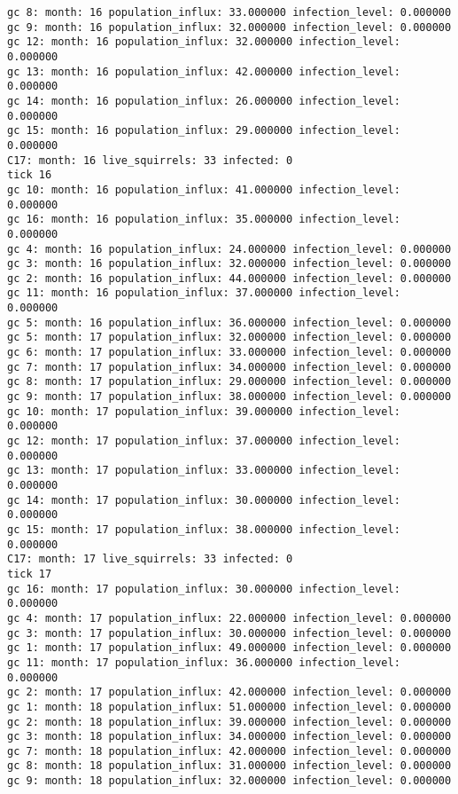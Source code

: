 \begin{lstlisting}[basicstyle=\tiny]
gc 8: month: 16 population_influx: 33.000000 infection_level: 0.000000
gc 9: month: 16 population_influx: 32.000000 infection_level: 0.000000
gc 12: month: 16 population_influx: 32.000000 infection_level: 0.000000
gc 13: month: 16 population_influx: 42.000000 infection_level: 0.000000
gc 14: month: 16 population_influx: 26.000000 infection_level: 0.000000
gc 15: month: 16 population_influx: 29.000000 infection_level: 0.000000
C17: month: 16 live_squirrels: 33 infected: 0
tick 16
gc 10: month: 16 population_influx: 41.000000 infection_level: 0.000000
gc 16: month: 16 population_influx: 35.000000 infection_level: 0.000000
gc 4: month: 16 population_influx: 24.000000 infection_level: 0.000000
gc 3: month: 16 population_influx: 32.000000 infection_level: 0.000000
gc 2: month: 16 population_influx: 44.000000 infection_level: 0.000000
gc 11: month: 16 population_influx: 37.000000 infection_level: 0.000000
gc 5: month: 16 population_influx: 36.000000 infection_level: 0.000000
gc 5: month: 17 population_influx: 32.000000 infection_level: 0.000000
gc 6: month: 17 population_influx: 33.000000 infection_level: 0.000000
gc 7: month: 17 population_influx: 34.000000 infection_level: 0.000000
gc 8: month: 17 population_influx: 29.000000 infection_level: 0.000000
gc 9: month: 17 population_influx: 38.000000 infection_level: 0.000000
gc 10: month: 17 population_influx: 39.000000 infection_level: 0.000000
gc 12: month: 17 population_influx: 37.000000 infection_level: 0.000000
gc 13: month: 17 population_influx: 33.000000 infection_level: 0.000000
gc 14: month: 17 population_influx: 30.000000 infection_level: 0.000000
gc 15: month: 17 population_influx: 38.000000 infection_level: 0.000000
C17: month: 17 live_squirrels: 33 infected: 0
tick 17
gc 16: month: 17 population_influx: 30.000000 infection_level: 0.000000
gc 4: month: 17 population_influx: 22.000000 infection_level: 0.000000
gc 3: month: 17 population_influx: 30.000000 infection_level: 0.000000
gc 1: month: 17 population_influx: 49.000000 infection_level: 0.000000
gc 11: month: 17 population_influx: 36.000000 infection_level: 0.000000
gc 2: month: 17 population_influx: 42.000000 infection_level: 0.000000
gc 1: month: 18 population_influx: 51.000000 infection_level: 0.000000
gc 2: month: 18 population_influx: 39.000000 infection_level: 0.000000
gc 3: month: 18 population_influx: 34.000000 infection_level: 0.000000
gc 7: month: 18 population_influx: 42.000000 infection_level: 0.000000
gc 8: month: 18 population_influx: 31.000000 infection_level: 0.000000
gc 9: month: 18 population_influx: 32.000000 infection_level: 0.000000

\end{lstlisting}
